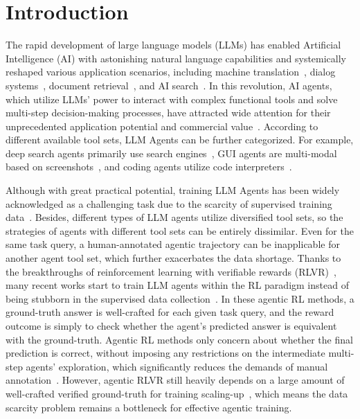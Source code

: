 \documentclass[10pt, a4paper, logo]{googledeepmind} %
\begin{document}
\vspace{-2mm}
\section{Introduction}\label{intro}
\vspace{-2mm}
The rapid development of large language models (LLMs) has enabled Artificial Intelligence (AI) with astonishing natural language capabilities and systemically reshaped various application scenarios, including machine translation~\citep{brown2020language,zhang2023prompting}, dialog systems~\citep{ouyang2022training,achiam2023gpt,deepseek-ai_deepseek-r1_2025}, document retrieval~\citep{zhu2023large}, and AI search~\citep{openai2025deepresearch,li2025towards}. In this revolution, AI agents, which utilize LLMs' power to interact with complex functional tools and solve multi-step decision-making processes, have attracted wide attention for their unprecedented application potential and commercial value~\citep{li2024survey,xi2025rise}. According to different available tool sets, LLM Agents can be further categorized. For example, deep search agents primarily use search engines~\citep{jin2025search,tongyidr}, GUI agents are multi-modal based on screenshots~\citep{wang2024gui,xie2024osworld,wang2025ui}, and coding agents utilize code interpreters~\citep{huang2023agentcoder,yang2024swe}.

Although with great practical potential, training LLM Agents has been widely acknowledged as a challenging task due to the scarcity of supervised training data~\citep{qi2024webrl,team2025kimi}.
Besides, different types of LLM agents utilize diversified tool sets, so the strategies of agents with different tool sets can be entirely dissimilar. Even for the same task query, a human-annotated agentic trajectory can be inapplicable for another agent tool set, which further exacerbates the data shortage. Thanks to the breakthroughs of reinforcement learning with verifiable rewards (RLVR)~\citep{guo2025deepseek}, many recent works start to train LLM agents within the RL paradigm instead of being stubborn in the supervised data collection~\citep{shang2025rstar2,jin2025search}. In these agentic RL methods, a ground-truth answer is well-crafted for each given task query, and the reward outcome is simply to check whether the agent's predicted answer is equivalent with the ground-truth. Agentic RL methods only concern about whether the final prediction is correct, without imposing any restrictions on the intermediate multi-step agents' exploration, which significantly reduces the demands of manual annotation~\citep{zhang2025landscape}. However, agentic RLVR still heavily depends on a large amount of well-crafted verified ground-truth for training scaling-up~\citep{zhao_absolute_2025,zhang2025landscape}, which means the data scarcity problem remains a bottleneck for effective agentic training.  
\end{document}
